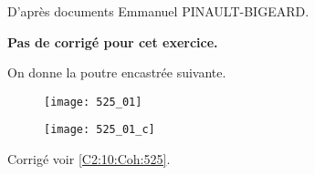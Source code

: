 \normaltrue
\correctionfalse


\setcounter{numques}{0}

\begin{flushright}
\footnotesize{D'après documents Emmanuel PINAULT-BIGEARD.}
\end{flushright}


\ifcorrection
\else
\textbf{Pas de corrigé pour cet exercice.}
\fi

On donne la poutre encastrée suivante.

\begin{figure}[H]
\centering
\texttt{[image: 525\_01]}
\end{figure}


\ifprof
\else
\fi

\ifprof
\else
\fi

\ifprof
\else
\fi

\ifprof
\begin{figure}[H]
\centering
\texttt{[image: 525\_01\_c]}
\end{figure}
\else

\begin{flushright}
\footnotesize{Corrigé  voir \ref{C2:10:Coh:525}.}
\end{flushright}%
\fi